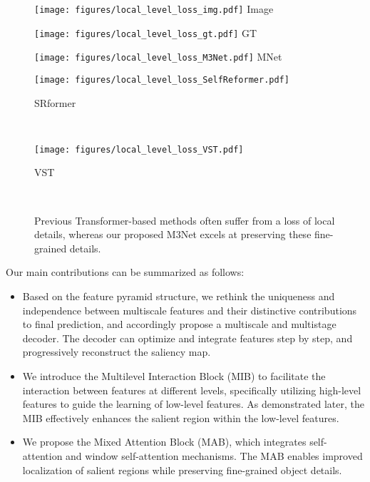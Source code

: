 \documentclass[lettersize,journal]{IEEEtran}
\begin{document}
\begin{figure}[t]
	\centering
	\begin{minipage}[t]{0.09\textwidth}
		\centering
		\texttt{[image: figures/local\_level\_loss\_img.pdf]}
		\centering\footnotesize{Image}
	\end{minipage}
	\begin{minipage}[t]{0.09\textwidth}
		\centering
		\texttt{[image: figures/local\_level\_loss\_gt.pdf]}
		\centering\footnotesize{GT}
	\end{minipage}
	\begin{minipage}[t]{0.09\textwidth}
		\centering
		\texttt{[image: figures/local\_level\_loss\_M3Net.pdf]}
		\centering\footnotesize{MNet}
	\end{minipage}
	\begin{minipage}[t]{0.09\textwidth}
		\centering
		\texttt{[image: figures/local\_level\_loss\_SelfReformer.pdf]}
		\centering\footnotesize{SRformer\par~\cite{SelfReformer}}
	\end{minipage}
	\begin{minipage}[t]{0.09\textwidth}
		\centering
		\texttt{[image: figures/local\_level\_loss\_VST.pdf]}
		\centering\footnotesize{VST\par~\cite{VST}}
	\end{minipage}
	\begin{minipage}[t]{0.1\textwidth}
	\end{minipage}
	\par\;\caption{Previous Transformer-based methods often suffer from a loss of local details, whereas our proposed M3Net excels at preserving these fine-grained details. }
	\label{fig:localloss}
\end{figure}
Our main contributions can be summarized as follows:
\begin{itemize}
	\item Based on the feature pyramid structure, we rethink the uniqueness and independence between multiscale features and their distinctive contributions to final prediction, and accordingly propose a multiscale and multistage decoder. The decoder can optimize and integrate features step by step, and progressively reconstruct the saliency map.
	\item We introduce the Multilevel Interaction Block (MIB) to facilitate the interaction between features at different levels, specifically utilizing high-level features to guide the learning of low-level features. As demonstrated later, the MIB effectively enhances the salient region within the low-level features. 
	\item We propose the Mixed Attention Block (MAB), which integrates self-attention and window self-attention mechanisms. The MAB enables improved localization of salient regions while preserving fine-grained object details. 
	
\end{itemize}
\end{document}
